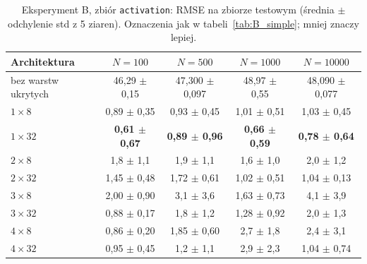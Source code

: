 \documentclass[11pt,a4paper]{article}
\begin{document}
	\begin{table}[H]
		\centering
		\footnotesize
		\caption{Eksperyment B, zbiór \texttt{activation}: RMSE na zbiorze testowym (średnia $\pm$ odchylenie std z 5 ziaren). Oznaczenia jak w tabeli~\ref{tab:B_simple}; mniej znaczy lepiej.}\label{tab:B_act}
		\begin{tabular}{@{}lcccc@{}}
			\toprule
			Architektura & $N=100$ & $N=500$ & $N=1000$ & $N=10000$ \\
			\midrule
			bez warstw ukrytych & 46,29 $\pm$ 0,15 & 47,300 $\pm$ 0,097 & 48,97 $\pm$ 0,55 & 48,090 $\pm$ 0,077 \\
			$1\times8$ & 0,89 $\pm$ 0,35 & 0,93 $\pm$ 0,45 & 1,01 $\pm$ 0,51 & 1,03 $\pm$ 0,45 \\
			$1\times32$ & \textbf{0,61 $\pm$ 0,67} & \textbf{0,89 $\pm$ 0,96} & \textbf{0,66 $\pm$ 0,59} & \textbf{0,78 $\pm$ 0,64} \\
			$2\times8$ & 1,8 $\pm$ 1,1 & 1,9 $\pm$ 1,1 & 1,6 $\pm$ 1,0 & 2,0 $\pm$ 1,2 \\
			$2\times32$ & 1,45 $\pm$ 0,48 & 1,72 $\pm$ 0,61 & 1,02 $\pm$ 0,51 & 1,04 $\pm$ 0,13 \\
			$3\times8$ & 2,00 $\pm$ 0,90 & 3,1 $\pm$ 3,6 & 1,63 $\pm$ 0,73 & 4,1 $\pm$ 3,9 \\
			$3\times32$ & 0,88 $\pm$ 0,17 & 1,8 $\pm$ 1,2 & 1,28 $\pm$ 0,92 & 2,0 $\pm$ 1,3 \\
			$4\times8$ & 0,86 $\pm$ 0,20 & 1,85 $\pm$ 0,60 & 2,7 $\pm$ 1,8 & 2,4 $\pm$ 3,1 \\
			$4\times32$ & 0,95 $\pm$ 0,45 & 1,2 $\pm$ 1,1 & 2,9 $\pm$ 2,3 & 1,04 $\pm$ 0,74 \\
			\bottomrule
		\end{tabular}
	\end{table}
	
\end{document}
